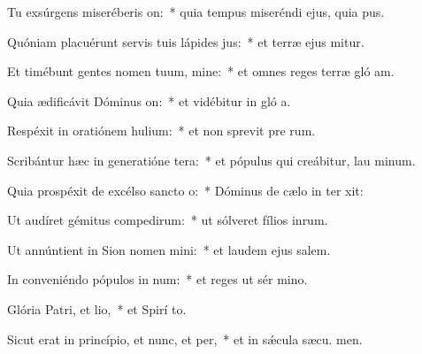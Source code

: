 \item Tu exsúrgens miseréberis on:~* quia tempus miseréndi ejus, quia  pus.
\item Quóniam placuérunt servis tuis lápides jus:~* et terræ ejus mitur.
\item Et timébunt gentes nomen tuum, mine:~* et omnes reges terræ gló am.
\item Quia ædificávit Dóminus on:~* et vidébitur in gló a.
\item Respéxit in oratiónem hulium:~* et non sprevit pre rum.
\item Scribántur hæc in generatióne tera:~* et pópulus qui creábitur, lau minum.
\item Quia prospéxit de excélso sancto o:~* Dóminus de cælo in ter xit:
\item Ut audíret gémitus compedirum:~* ut sólveret fílios inrum.
\item Ut annúntient in Sion nomen mini:~* et laudem ejus  salem.
\item In conveniéndo pópulos in num:~* et reges ut sér mino.
\item Glória Patri, et lio,~* et Spirí to.
\item Sicut erat in princípio, et nunc, et per,~* et in sǽcula sæcu. men.
